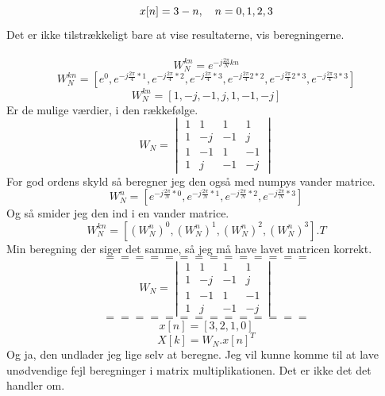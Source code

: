 \begin{EksamensOpgaver}
\begin{Eksamenssæt}[2022]
\begin{eksamensOpgave}
\begin{UnderOpgave}
            \end{UnderOpgave}
        \end{eksamensOpgave}
        \begin{eksamensOpgave}[DFT ]
            \begin{UnderOpgave}[Beregn \text{$W_N$} for N = 4 og beregn derefter DFT transformationen af signalet]
                \[x[n] = 3 - n, \tab{0} n = 0, 1, 2, 3\]
                Det er ikke tilstrækkeligt bare at vise resultaterne, vis beregningerne.\\\\
                \[W_N^{kn} = e^{ - j \frac{2\pi}{N} kn}\]
                \[W_N^{kn} = [e^{0}, e^{ - j \frac{2\pi}{4} * 1}, e^{ - j \frac{2\pi}{4} * 2},  e^{ - j \frac{2\pi}{4} * 3}, e^{ - j \frac{2\pi}{4} 2 * 2}, e^{ - j \frac{2\pi}{4} 2 * 3}, e^{ - j \frac{2\pi}{4} 3 * 3}]\]
                \[W_N^{kn} = [1, -j, -1, j, 1, -1, -j]\]
                Er de mulige værdier, i den rækkefølge.
                \[W_N = \begin{vmatrix}
                    1 &  1 &  1 &  1 \\
                    1 & -j & -1 &  j \\
                    1 & -1 &  1 & -1 \\
                    1 &  j & -1 & -j 
                \end{vmatrix}\]
                For god ordens skyld så beregner jeg den også med numpys vander matrice. 
                \[W_N^n = [e^{ - j \frac{2\pi}{N} * 0}, e^{ - j \frac{2\pi}{N} * 1}, e^{ - j \frac{2\pi}{N} * 2}, e^{ - j \frac{2\pi}{N} * 3}]\]
                Og så smider jeg den ind i en vander matrice. 
                \[W_N^{kn} = [(W_N^n)^0, (W_N^n)^1, (W_N^n)^2, (W_N^n)^3].T \]
                Min beregning der siger det samme, så jeg må have lavet matricen korrekt. 
                \[==============\]
                \[W_N = \begin{vmatrix}
                    1 &  1 &  1 &  1 \\
                    1 & -j & -1 &  j \\
                    1 & -1 &  1 & -1 \\
                    1 &  j & -1 & -j 
                \end{vmatrix}\]
                \[==============\]
                \[x[n] = [3, 2, 1, 0]\]
                \[X[k] = W_N . x[n]^T\]
                Og ja, den undlader jeg lige selv at beregne. Jeg vil kunne komme til at lave unødvendige fejl beregninger i matrix multiplikationen. Det er ikke det det handler om. 

\end{UnderOpgave}
\end{eksamensOpgave}
\end{Eksamenssæt}
\end{EksamensOpgaver}
